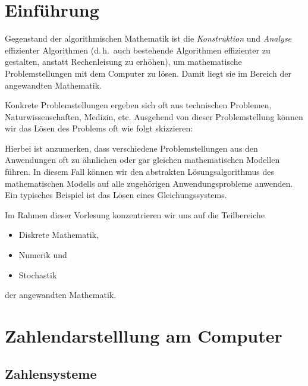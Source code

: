 \documentclass[a4paper]{article}
\begin{document}
\maketitle
\tableofcontents

\section*{Einführung}

Gegenstand der algorithmischen Mathematik ist die \emph{Konstruktion} und \emph{Analyse} effizienter Algorithmen (d.\,h.\ auch bestehende Algorithmen effizienter zu gestalten, anstatt Rechenleisung zu erhöhen), um mathematische Problemstellungen mit dem Computer zu lösen. Damit liegt sie im Bereich der angewandten Mathematik.

Konkrete Problemstellungen ergeben sich oft aus technischen Problemen, Naturwissenschaften, Medizin, etc. Ausgehend von dieser Problemstellung können wir das Lösen des Problems oft wie folgt skizzieren:

\begin{center}
    \begin{tikzpicture}
    \end{tikzpicture}
\end{center}

Hierbei ist anzumerken, dass verschiedene Problemstellungen aus den Anwendungen oft zu ähnlichen oder gar gleichen mathematischen Modellen führen. In diesem Fall können wir den abstrakten Lösungsalgorithmus des mathematischen Modells auf alle zugehörigen Anwendungsprobleme anwenden. Ein typisches Beispiel ist das Lösen eines Gleichungssystems.

Im Rahmen dieser Vorlesung konzentrieren wir uns auf die Teilbereiche
\begin{itemize}
    \item Diskrete Mathematik,
    \item Numerik und
    \item Stochastik
\end{itemize}
der angewandten Mathematik.

\section{Zahlendarstelllung am Computer}

\subsection{Zahlensysteme}
\end{document}
